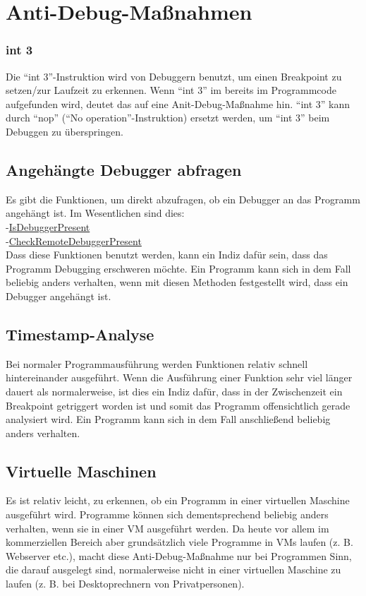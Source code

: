 \section{Anti-Debug-Maßnahmen}
\subsubsection{int 3}
Die \enquote{int 3}-Instruktion wird von Debuggern benutzt, um einen Breakpoint zu setzen/zur Laufzeit zu erkennen. Wenn \enquote{int 3} im bereits im Programmcode aufgefunden wird, deutet das auf eine Anit-Debug-Maßnahme hin. \enquote{int 3} kann durch \enquote{nop} (\enquote{No operation}-Instruktion) ersetzt werden, um \enquote{int 3} beim Debuggen zu überspringen.
\subsection{Angehängte Debugger abfragen}
Es gibt die Funktionen, um direkt abzufragen, ob ein Debugger an das Programm angehängt ist. Im Wesentlichen sind dies:\\
-\href{https://msdn.microsoft.com/en-us/library/ms680345(VS.85).aspx}{IsDebuggerPresent} \\
-\href{https://msdn.microsoft.com/en-us/library/ms679280(VS.85).aspx}{CheckRemoteDebuggerPresent} \\
Dass diese Funktionen benutzt werden, kann ein Indiz dafür sein, dass das Programm Debugging erschweren möchte. Ein Programm kann sich in dem Fall beliebig anders verhalten, wenn mit diesen Methoden festgestellt wird, dass ein Debugger angehängt ist.
\subsection{Timestamp-Analyse}
Bei normaler Programmausführung werden Funktionen relativ schnell hintereinander ausgeführt. Wenn die Ausführung einer Funktion sehr viel länger dauert als normalerweise, ist dies ein Indiz dafür, dass in der Zwischenzeit ein Breakpoint getriggert worden ist und somit das Programm offensichtlich gerade analysiert wird. Ein Programm kann sich in dem Fall anschließend beliebig anders verhalten.
\subsection{Virtuelle Maschinen}
Es ist relativ leicht, zu erkennen, ob ein Programm in einer virtuellen Maschine ausgeführt wird. Programme können sich dementsprechend beliebig anders verhalten, wenn sie in einer VM ausgeführt werden. Da heute vor allem im kommerziellen Bereich aber grundsätzlich viele Programme in VMs laufen (z. B. Webserver etc.), macht diese Anti-Debug-Maßnahme nur bei Programmen Sinn, die darauf ausgelegt sind, normalerweise nicht in einer virtuellen Maschine zu laufen (z. B. bei Desktoprechnern von Privatpersonen).
